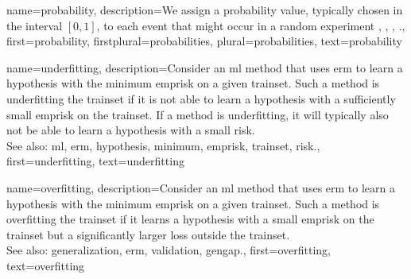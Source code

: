 {name={probability}, 
	description={We assign a probability value, typically chosen in the 
		interval $[0,1]$, to each event that might occur in a random experiment 
		\cite{BillingsleyProbMeasure}, \cite{BertsekasProb}, \cite{HalmosMeasure},  \cite{KallenbergBook}.},
	first={probability},
	firstplural={probabilities},
	plural={probabilities},
	text={probability}
}
	
{name={underfitting},
	description={Consider 
		an \gls{ml} method that uses \gls{erm} to learn a \gls{hypothesis} with the \gls{minimum} \gls{emprisk} 
		on a given \gls{trainset}. Such a method is underfitting the \gls{trainset} if it is 
		not able to learn a \gls{hypothesis} with a sufficiently small \gls{emprisk} on the \gls{trainset}. 
		If a method is underfitting, it will typically also not be able to learn a \gls{hypothesis} with 
		a small \gls{risk}.
					\\ 
		See also: \gls{ml}, \gls{erm}, \gls{hypothesis}, \gls{minimum}, \gls{emprisk}, \gls{trainset}, \gls{risk}.},
	first={underfitting},
	text={underfitting}
}

{name={overfitting},
	description={Consider an 
		\gls{ml} method that uses \gls{erm} to learn a \gls{hypothesis} with the \gls{minimum} \gls{emprisk} on 
		a given \gls{trainset}. Such a method is overfitting the \gls{trainset} if it learns 
		a \gls{hypothesis} with a small \gls{emprisk} on the \gls{trainset} but a significantly larger \gls{loss} outside the \gls{trainset}.
					\\ 
		See also: \gls{generalization}, \gls{erm},  \gls{validation}, \gls{gengap}.},
	first={overfitting},
	text={overfitting}
}


